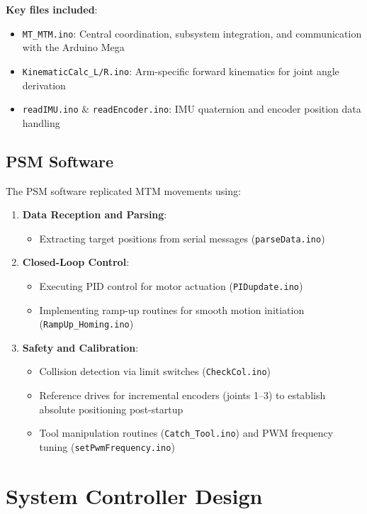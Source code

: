 \textbf{Key files included}:
\begin{itemize}
    \item \texttt{MT\_MTM.ino}: Central coordination, subsystem integration, and communication with the Arduino Mega
    \item \texttt{KinematicCalc\_L/R.ino}: Arm-specific forward kinematics for joint angle derivation
    \item \texttt{readIMU.ino} \& \texttt{readEncoder.ino}: IMU quaternion and encoder position data handling
\end{itemize}

\subsection{PSM Software}
The PSM software replicated MTM movements using:

\begin{enumerate}
    \item \textbf{Data Reception and Parsing}:
    \begin{itemize}
        \item Extracting target positions from serial messages (\texttt{parseData.ino})
    \end{itemize}
    
    \item \textbf{Closed-Loop Control}:
    \begin{itemize}
        \item Executing PID control for motor actuation (\texttt{PIDupdate.ino})
        \item Implementing ramp-up routines for smooth motion initiation (\texttt{RampUp\_Homing.ino})
    \end{itemize}
    
    \item \textbf{Safety and Calibration}:
    \begin{itemize}
        \item Collision detection via limit switches (\texttt{CheckCol.ino})
        \item Reference drives for incremental encoders (joints 1--3) to establish absolute positioning post-startup
        \item Tool manipulation routines (\texttt{Catch\_Tool.ino}) and PWM frequency tuning (\texttt{setPwmFrequency.ino})
    \end{itemize}
\end{enumerate}

\section{System Controller Design}

